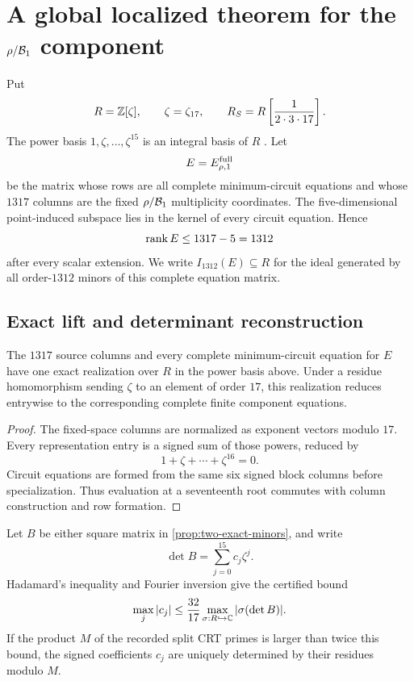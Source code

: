 \section{A global localized theorem for the \texorpdfstring{\(\rho/\mathcal B_1\)}{rho/B1} component}
\label{sec:global-rho}

Put
\[
 R=\mathbb Z[\zeta],\qquad \zeta=\zeta_{17},\qquad
 R_S=R\left[\frac1{2\cdot3\cdot17}\right].
\]
The power basis \(1,\zeta,\ldots,\zeta^{15}\) is an integral basis of
\(R\) \cite{Washington1997}.  Let
\[
 E=E_{\rho,1}^{\mathrm{full}}
\]
be the matrix whose rows are all complete minimum-circuit equations and
whose \(1317\) columns are the fixed \(\rho/\mathcal B_1\) multiplicity
coordinates.  The five-dimensional point-induced subspace lies in the
kernel of every circuit equation.  Hence
\[
 \operatorname{rank} E\leq1317-5=1312
\]
after every scalar extension.  We write \(I_{1312}(E)\subseteq R\) for
the ideal generated by all order-\(1312\) minors of this complete
equation matrix.

\subsection{Exact lift and determinant reconstruction}

\begin{lemma}
\label{lem:common-cyclotomic-lift}
The \(1317\) source columns and every complete minimum-circuit equation
for \(E\) have one exact realization over \(R\) in the power basis above.
Under a residue homomorphism sending \(\zeta\) to an element of order
\(17\), this realization reduces entrywise to the corresponding complete
finite component equations.
\end{lemma}

\begin{proof}
The fixed-space columns are normalized as exponent vectors modulo \(17\).
Every representation entry is a signed sum of those powers, reduced by
\[
 1+\zeta+\cdots+\zeta^{16}=0.
\]
Circuit equations are formed from the same six signed block columns
before specialization.  Thus evaluation at a seventeenth root commutes
with column construction and row formation.
\end{proof}

\begin{lemma}
\label{lem:certified-crt}
Let \(B\) be either square matrix in
\cref{prop:two-exact-minors}, and write
\[
 \det B=\sum_{j=0}^{15}c_j\zeta^j.
\]
Hadamard's inequality and Fourier inversion give the certified bound
\[
 \max_j|c_j|
 \leq\frac{32}{17}
 \max_{\sigma:R\hookrightarrow\mathbb C}|\sigma(\det B)|.
\]
If the product \(M\) of the recorded split CRT primes is larger than
twice this bound, the signed coefficients \(c_j\) are uniquely determined
by their residues modulo \(M\).
\end{lemma}

